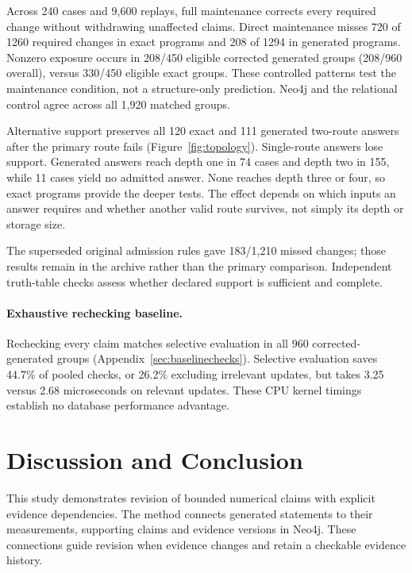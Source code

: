 \documentclass[runningheads]{llncs}
\newcommand{\SemCoreCases}{240}
\newcommand{\SemReplayCells}{9,600}
\newcommand{\SemParityGroups}{1,920}
\newcommand{\SemRootOne}{74}
\newcommand{\SemRootTwo}{155}
\newcommand{\SemMissingRoots}{11}
\newcommand{\SemFixtureRequired}{1260}
\newcommand{\SemFixtureMissed}{720}
\newcommand{\SemFixtureAlternative}{120}
\newcommand{\SemGeneratedRequired}{1294}
\newcommand{\SemGeneratedMissed}{208}
\newcommand{\SemGeneratedAlternative}{111}
\begin{document}
Across \SemCoreCases{} cases and \SemReplayCells{} replays, full maintenance
corrects every required change without withdrawing unaffected claims.
Direct maintenance misses \SemFixtureMissed{} of \SemFixtureRequired{}
required changes in exact programs and \SemGeneratedMissed{} of
\SemGeneratedRequired{} in generated programs.
Nonzero exposure occurs in 208/450 eligible corrected generated groups
(208/960 overall), versus 330/450 eligible exact groups. These controlled
patterns test the maintenance condition, not a structure-only prediction.
Neo4j and the relational control agree across all \SemParityGroups{}
matched groups.

Alternative support preserves all \SemFixtureAlternative{} exact and
\SemGeneratedAlternative{} generated two-route answers after the primary
route fails (Figure~\ref{fig:topology}). Single-route answers lose support.
Generated answers reach depth one in \SemRootOne{} cases and depth two in
\SemRootTwo{}, while \SemMissingRoots{} cases yield no admitted answer.
None reaches depth three or four, so exact programs provide the deeper tests.
The effect depends on which inputs an answer requires and whether another
valid route survives, not simply its depth or storage size.

The superseded original admission rules gave 183/1,210 missed changes;
those results remain in the archive rather than the primary comparison.
Independent truth-table checks assess whether declared support is sufficient
and complete.

\paragraph{Exhaustive rechecking baseline.}
Rechecking every claim matches selective evaluation in all 960 corrected-generated
groups (Appendix~\ref{sec:baselinechecks}). Selective evaluation saves 44.7\% of
pooled checks, or 26.2\% excluding irrelevant updates, but takes 3.25 versus
2.68 microseconds on relevant updates. These CPU kernel timings establish no
database performance advantage.

\section{Discussion and Conclusion}

This study demonstrates revision of bounded numerical claims with explicit
evidence dependencies. The method connects generated statements to
their measurements, supporting claims and evidence versions in Neo4j.
These connections guide revision when evidence changes and retain a checkable
evidence history.
\end{document}
